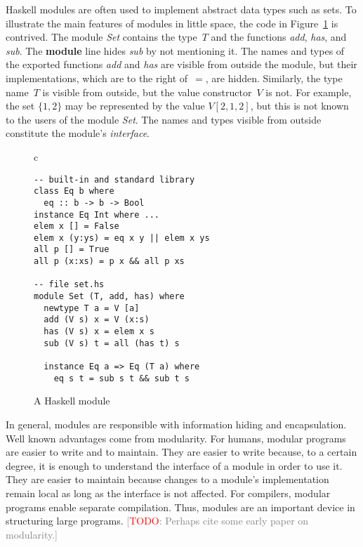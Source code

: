 \documentclass[conference,compsoc]{IEEEtran} %
\newcommand{\todo}[1]{{\small \textcolor{gray}{[\textcolor{red}{TODO}: #1]}}}
\begin{document}

Haskell modules are often used to implement abstract data types such as
sets.  To illustrate the main features of modules in little space, the code
in Figure~\ref{fig:haskell} is contrived.  The module \textit{Set} contains
the type~$T$ and the functions \textit{add}, \textit{has}, and
\textit{sub}. The \textbf{module} line hides \textit{sub} by not mentioning
it. The names and types of the exported functions \textit{add} and
\textit{has} are visible from outside the module, but their
implementations, which are to the right of~$=$, are hidden.  Similarly, the
type name~$T$ is visible from outside, but the value constructor~$V$ is
not. For example, the set $\{1,2\}$ may be represented by the value
$V[2,1,2]$, but this is not known to the users of the module \textit{Set}.
The names and types visible from outside constitute the module's
\emph{interface}.

\begin{figure}\footnotesize %
\begin{center}
\begin{tabular}{c}
\begin{lstlisting}[style=hs]
-- built-in and standard library
class Eq b where
  eq :: b -> b -> Bool
instance Eq Int where ...
elem x [] = False
elem x (y:ys) = eq x y || elem x ys
all p [] = True
all p (x:xs) = p x && all p xs

-- file set.hs
module Set (T, add, has) where
  newtype T a = V [a]
  add (V s) x = V (x:s)
  has (V s) x = elem x s
  sub (V s) t = all (has t) s

  instance Eq a => Eq (T a) where
    eq s t = sub s t && sub t s
\end{lstlisting}
\end{tabular}
\end{center}
\caption{A Haskell module}\label{fig:haskell}
\end{figure} %

In general, modules are responsible with information hiding and
encapsulation. Well known advantages come from modularity. For humans,
modular programs are easier to write and to maintain. They are easier to
write because, to a certain degree, it is enough to understand the
interface of a module in order to use it. They are easier to maintain
because changes to a module's implementation remain local as long as the
interface is not affected. For compilers, modular programs enable separate
compilation. Thus, modules are an important device in structuring large
programs. \todo{Perhaps cite some early paper on modularity.}
\end{document}
